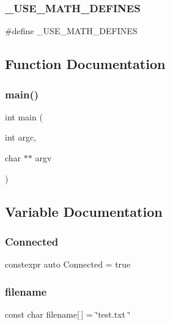 \subsubsection{\+\_\+\+U\+S\+E\+\_\+\+M\+A\+T\+H\+\_\+\+D\+E\+F\+I\+N\+ES}
{\footnotesize\ttfamily \#define \+\_\+\+U\+S\+E\+\_\+\+M\+A\+T\+H\+\_\+\+D\+E\+F\+I\+N\+ES}



\subsection{Function Documentation}
\mbox{\label{_myo_8cpp_a3c04138a5bfe5d72780bb7e82a18e627}} 
\subsubsection{main()}
{\footnotesize\ttfamily int main (\begin{DoxyParamCaption}\item[{int}]{argc,  }\item[{char $\ast$$\ast$}]{argv }\end{DoxyParamCaption})}



\subsection{Variable Documentation}
\mbox{\label{_myo_8cpp_afd1c6f44ddce5cb060370262eecd9c17}} 
\subsubsection{Connected}
{\footnotesize\ttfamily constexpr auto Connected = true}

\mbox{\label{_myo_8cpp_a1dd0092466ef147d6873cd10f5d5e38b}} 
\subsubsection{filename}
{\footnotesize\ttfamily const char filename[$\,$] = \char`\"{}test.\+txt \char`\"{}}

